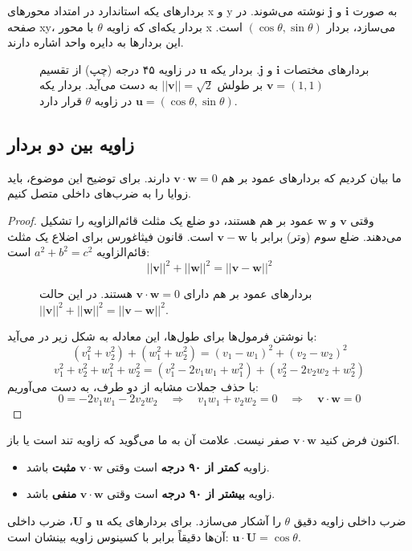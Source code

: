 \documentclass[12pt, a4paper]{book}
\begin{document}
	بردارهای یکه استاندارد در امتداد محورهای x و y به صورت $\mathbf{i}$ و $\mathbf{j}$ نوشته می‌شوند. در صفحه xy، بردار یکه‌ای که زاویه $\theta$ با محور x می‌سازد، بردار $(\cos\theta, \sin\theta)$ است. این بردارها به دایره واحد اشاره دارند.
	
	\begin{figure}[h!]
		\centering
		\caption{بردارهای مختصات $\mathbf{i}$ و $\mathbf{j}$. بردار یکه $\mathbf{u}$ در زاویه ۴۵ درجه (چپ) از تقسیم $\mathbf{v}=(1,1)$ بر طولش $||\mathbf{v}||=\sqrt{2}$ به دست می‌آید. بردار یکه $\mathbf{u}=(\cos\theta, \sin\theta)$ در زاویه $\theta$ قرار دارد.}
	\end{figure}
	
	\subsection*{زاویه بین دو بردار}
	ما بیان کردیم که بردارهای عمود بر هم $\mathbf{v} \cdot \mathbf{w} = 0$ دارند. برای توضیح این موضوع، باید زوایا را به ضرب‌های داخلی متصل کنیم.
	\begin{proof}
		وقتی $\mathbf{v}$ و $\mathbf{w}$ عمود بر هم هستند، دو ضلع یک مثلث قائم‌الزاویه را تشکیل می‌دهند. ضلع سوم (وتر) برابر با $\mathbf{v} - \mathbf{w}$ است. قانون فیثاغورس برای اضلاع یک مثلث قائم‌الزاویه $a^2 + b^2 = c^2$ است:
		\[ ||\mathbf{v}||^2 + ||\mathbf{w}||^2 = ||\mathbf{v} - \mathbf{w}||^2 \]
		\begin{figure}[h!]
			\centering
			\caption{بردارهای عمود بر هم دارای $\mathbf{v} \cdot \mathbf{w}=0$ هستند. در این حالت $ ||\mathbf{v}||^2 + ||\mathbf{w}||^2 = ||\mathbf{v}-\mathbf{w}||^2 $.}
		\end{figure}
		با نوشتن فرمول‌ها برای طول‌ها، این معادله به شکل زیر در می‌آید:
		\[ (v_1^2 + v_2^2) + (w_1^2 + w_2^2) = (v_1 - w_1)^2 + (v_2 - w_2)^2 \]
		\[ v_1^2 + v_2^2 + w_1^2 + w_2^2 = (v_1^2 - 2v_1w_1 + w_1^2) + (v_2^2 - 2v_2w_2 + w_2^2) \]
		با حذف جملات مشابه از دو طرف، به دست می‌آوریم:
		\[ 0 = -2v_1w_1 - 2v_2w_2 \quad \Rightarrow \quad v_1w_1 + v_2w_2 = 0 \quad \Rightarrow \quad \mathbf{v} \cdot \mathbf{w} = 0 \]
	\end{proof}
	اکنون فرض کنید $\mathbf{v} \cdot \mathbf{w}$ صفر نیست. علامت آن به ما می‌گوید که زاویه تند است یا باز.
	\begin{itemize}
		\item زاویه \textbf{کمتر از ۹۰ درجه} است وقتی $\mathbf{v} \cdot \mathbf{w}$ \textbf{مثبت} باشد.
		\item زاویه \textbf{بیشتر از ۹۰ درجه} است وقتی $\mathbf{v} \cdot \mathbf{w}$ \textbf{منفی} باشد.
	\end{itemize}
	ضرب داخلی زاویه دقیق $\theta$ را آشکار می‌سازد. برای بردارهای یکه $\mathbf{u}$ و $\mathbf{U}$، ضرب داخلی آن‌ها دقیقاً برابر با کسینوس زاویه بینشان است: $\mathbf{u} \cdot \mathbf{U} = \cos\theta$.
	
\end{document}
